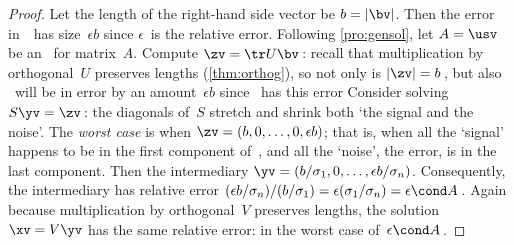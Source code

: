 \begin{proof} 
Let the length of the right-hand side vector be \(b=|\bv|\).
Then the error in~\bv\ has size~\(\epsilon b\) since \(\epsilon\)~is the relative error.
Following \autoref{pro:gensol},
let \(A=\usv\) be an \svd\ for matrix~\(A\).
Compute \(\zv=\tr U\bv\)\,: recall that multiplication by orthogonal~\(U\) preserves lengths (\autoref{thm:orthog}), so not only is \(|\zv|=b\)\,, but also \zv~will be in error by an amount~\(\epsilon b\) since \bv~has this error 
Consider solving \(S\yv=\zv\)\,: the diagonals of~\(S\) stretch and shrink both `the signal and the noise'.
The \emph{worst case} is when \(\zv=(b,0,\ldots,0,\epsilon b)\); that is, when all the `signal' happens to be in the first component of~\zv, and all the `noise', the error, is in the last component.
Then the intermediary \(\yv=(b/\sigma_1,0,\ldots,\epsilon b/\sigma_n)\).
Consequently, the intermediary has relative error \((\epsilon b/\sigma_n)/(b/\sigma_1)=\epsilon(\sigma_1/\sigma_n)=\epsilon\cond A \)\,.
Again because multiplication by orthogonal~\(V\) preserves lengths, the solution \(\xv=V\yv\) has the same relative error:  in the worst case of~\(\epsilon\cond A\)\,.
\end{proof}

